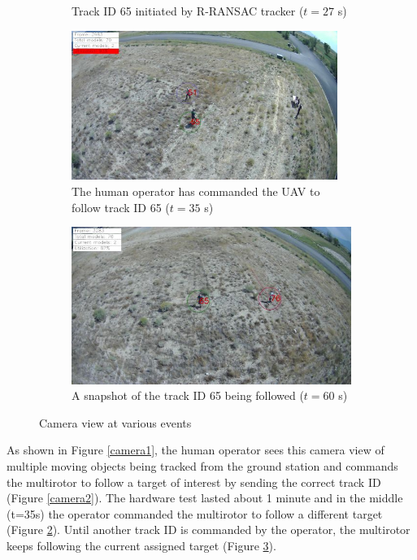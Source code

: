 \begin{figure}[htbp]
\begin{subfigure}{0.48\linewidth}
		\caption{Track ID 65 initiated by R-RANSAC tracker ($t=27$ s)}
		\label{camera3}
	\end{subfigure}
	\begin{subfigure}{0.48\linewidth}
		\centering
		\includegraphics[width=0.95\textwidth]{images/chapter3/ID65_follow_begin.png}
		\caption{The human operator has commanded the UAV to follow track ID 65 ($t=35$ s)}
		\label{camera4}
	\end{subfigure}
	\centering
	\begin{subfigure}{0.48\linewidth}
		\centering
		\includegraphics[width=\textwidth]{images/chapter3/ID65_following.png}
		\caption{A snapshot of the track ID 65 being followed ($t=60$ s)}
		\label{camera5}
	\end{subfigure}
	\caption{Camera view at various events}
	\label{camera}
\end{figure}
As shown in Figure \ref{camera1}, the human operator sees this camera view of multiple moving objects being tracked from the ground station and commands the multirotor to follow a target of interest by sending the correct track ID (Figure \ref{camera2}). The hardware test lasted about 1 minute and in the middle (t=35s) the operator commanded the multirotor to follow a different target (Figure \ref{camera4}). Until another track ID is commanded by the operator, the multirotor keeps following the current assigned target (Figure \ref{camera5}).

